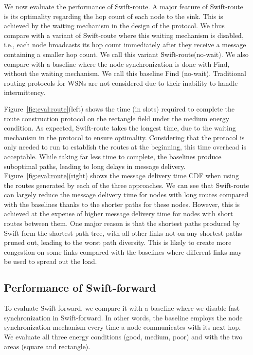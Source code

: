 \documentclass[lettersize,journal]{IEEEtran}
\newcommand{\ours}{Swift\xspace}
\newcommand{\route}{Swift-route\xspace}
\newcommand{\forward}{Swift-forward\xspace}
\begin{document}
We now evaluate the performance of \route. A major feature of \route is its optimality regarding the hop count of each node to the sink. This is achieved by the waiting mechanism in the design of the protocol. We thus compare with a variant of \route where this waiting mechanism is disabled, i.e., each node broadcasts its hop count immediately after they receive a message containing a smaller hop count. We call this variant \route (no-wait). We also compare with a baseline where the node synchronization is done with Find, without the waiting mechanism. We call this baseline Find (no-wait). Traditional routing protocols for WSNs are not considered due to their inability to handle intermittency.

Figure~\ref{fig:eval:route}(left) shows the time (in slots) required to complete the route construction protocol on the rectangle field under the medium energy condition. As expected, \route takes the longest time, due to the waiting mechanism in the protocol to ensure optimality. Considering that the protocol is only needed to run to establish the routes at the beginning, this time overhead is acceptable. While taking far less time to complete, the baselines produce suboptimal paths, leading to long delays in message delivery. Figure~\ref{fig:eval:route}(right) shows the message delivery time CDF when using the routes generated by each of the three approaches. We can see that \route can largely reduce the message delivery time for nodes with long routes compared with the baselines thanks to the shorter paths for these nodes.
However, this is achieved at the expense of higher message delivery time for nodes with short routes between them. One major reason is that the shortest paths produced by \ours form the shortest path tree, with all other links not on any shortest paths pruned out, leading to the worst path diversity. This is likely to create more congestion on some links compared with the baselines where different links may be used to spread out the load.

\subsection{Performance of \forward}
To evaluate \forward, we compare it with a baseline where we disable fast synchronization in \forward. In other words, the baseline employs the node synchronization mechanism every time a node communicates with its next hop. We evaluate all three energy conditions (good, medium, poor) and with the two areas (square and rectangle).
\end{document}
